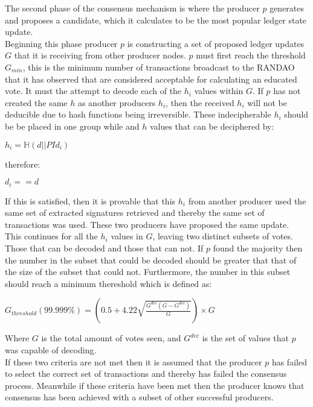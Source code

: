The second phase of the consensus mechanism is where the producer $p$ generates and proposes a candidate, which it calculates to be the most popular ledger state update. \\


Beginning this phase producer $p$ is constructing a set of proposed ledger updates $G$ that it is receiving from other producer nodes. $p$ must first reach the threshold $G_{min}$, this is the minimum number of transactions broadcast to the RANDAO that it has observed that are considered acceptable for calculating an educated vote. It must the attempt to decode each of the $h_i$ values within $G$. If $p$ has not created the same $h$ as another producers $h_i$, then the received $h_i$ will not be deducible due to hash functions being irreversible. These indecipherable $h_i$ should be be placed in one group while and $h$ values that can be deciphered by: 

\begin{center} 
$h_i = \mathbb{H}(d || PId_i)$
\end{center} 

therefore:

\begin{center} 
$d_i == d$
\end{center} 

If this is satisfied, then it is provable that this $h_i$ from another producer used the same set of extracted signatures retrieved and thereby the same set of transactions was used. These two producers have proposed the same update. \\

This continues for all the $h_i$ values in $G$, leaving two distinct subsets of votes. Those that can be decoded and those that can not. If $p$ found the majority then the number in the subset that could be decoded should be greater that that of the size of the subset that could not. Furthermore, the number in this subset should reach a minimum thereshold which is defined as:

\begin{center} 
$G_{threshold}(99.999\%) = \left( 0.5 + 4.22\sqrt{\frac{G^{dec}(G-G^{dec})}{G}}\right) \times G$
\end{center} 

Where $G$ is the total amount of votes seen, and $G^{dec}$ is the set of values that $p$ was capable of decoding. \\

If these two criteria are not met then it is assumed that the producer $p$ has failed to select the correct set of transactions and thereby has failed the consensus process. Meanwhile if these criteria have been met then the producer knows that consensus has been achieved with a subset of other successful producers. \\

